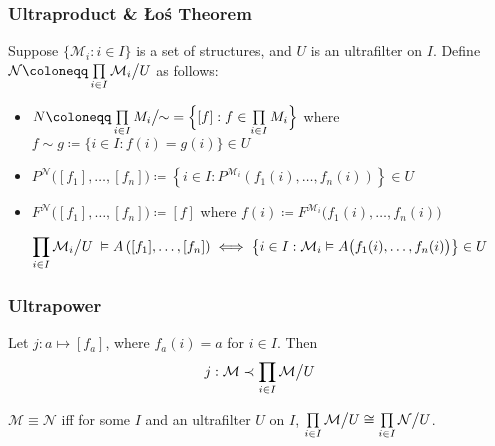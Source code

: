 \documentclass[UTF8,11pt,colorlinks,compress,openany]{beamer}%
\begin{document}
\begin{frame}\frametitle{Ultraproduct \& \L o\'s Theorem}
\setlength\abovedisplayskip{0pt}
\setlength\belowdisplayskip{0pt}
	\begin{definition}[Ultraproduct]
		Suppose $\{\mathcal{M}_i: i\in I\}$ is a set of structures, and $U$ is an ultrafilter on $I$. Define $\mathcal{N}\coloneqq \prod\limits_{i\in I}\mathcal{M}_i\big\slash U$ as follows:
		\begin{itemize}
			\item $N\coloneqq \prod\limits_{i\in I}M_i\big\slash\!\!\sim \;=\Big\{[f]: f\in\prod\limits_{i\in I} M_i\Big\}$ where $f\sim g\coloneqq \big\{i\in I: f(i)=g(i)\big\}\in U$
			\item $P^{\mathcal{N}}\big([f_1],\dots,[f_n]\big)\coloneqq \left\{i\in I: P^{\mathcal{M}_i}(f_1(i),\dots,f_n(i))\right\}\in U$
			\item $F^{\mathcal{N}}\big([f_1],\dots,[f_n]\big)\coloneqq [f]$ where $f(i)\coloneqq F^{\mathcal{M}_i}\big(f_1(i),\dots,f_n(i)\big)$
		\end{itemize}
	\end{definition}
	\begin{theorem}[\L o\'s Theorem]
		\[\prod\limits_{i\in I}\mathcal{M}_i\big\slash U\;\vDash A\left([f_1],\dots,[f_n]\right)\iff\left\{i\in I:\mathcal{M}_i\vDash A\big(f_1(i),\dots,f_n(i)\big)\right\}\in U\]
	\end{theorem}
\end{frame}

\begin{frame}\frametitle{Ultrapower}
	\begin{block}{}
	Let $j: a\mapsto[f_a]$, where $f_a(i)=a$ for $i\in I$. Then
	\[j:\mathcal{M}\prec\prod\limits_{i\in I}\mathcal{M}\big\slash U\]
	\end{block}
	\begin{theorem}
	$\mathcal{M}\equiv\mathcal{N}$ iff for some $I$ and an ultrafilter $U$ on $I$, $\prod\limits_{i\in I}\mathcal{M}\big\slash U\cong\prod\limits_{i\in I}\mathcal{N}\big\slash U$.
	\end{theorem}
\end{frame}
\end{document}
